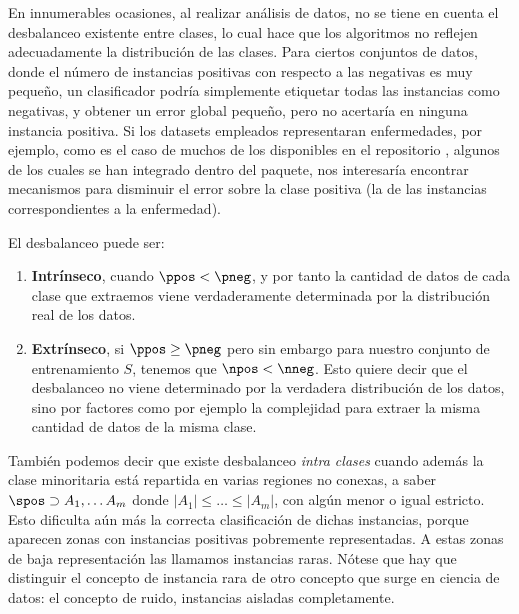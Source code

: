 En innumerables ocasiones, al realizar análisis de datos, no se tiene en cuenta el desbalanceo existente entre clases, lo
cual hace que los algoritmos no reflejen adecuadamente la distribución de las clases. Para ciertos conjuntos de datos,
donde el número de instancias positivas con respecto a las negativas es muy pequeño, un clasificador podría simplemente
etiquetar todas las instancias como negativas, y obtener un error global pequeño, pero no acertaría en ninguna instancia
positiva. Si los datasets empleados representaran enfermedades, por ejemplo, como es el caso de muchos de los
disponibles en el repositorio , algunos de los cuales se han integrado dentro del paquete, 
nos interesaría encontrar mecanismos para disminuir el error sobre la clase positiva (la de las instancias correspondientes
a la enfermedad).

El desbalanceo puede ser:

\begin{enumerate}[i]
  \item \textbf{Intrínseco}, cuando $\ppos < \pneg$, y por tanto la cantidad de datos de cada clase que extraemos viene 
  verdaderamente determinada por la distribución real de los datos.

  \item \textbf{Extrínseco}, si $\ppos \ge \pneg$ pero sin embargo para nuestro conjunto de entrenamiento $S$, 
  tenemos que $\npos < \nneg$. Esto quiere decir que el desbalanceo no viene determinado por la verdadera distribución de
  los datos, sino por factores como por ejemplo la complejidad para extraer la misma cantidad de datos de la misma clase.
\end{enumerate}

También podemos decir que existe desbalanceo \textit{intra clases} cuando además la clase minoritaria está repartida en varias 
regiones no conexas, a saber $\spos \supset A_1, \ldots A_m$ donde $|A_1| \le \ldots \le |A_m|$, con algún menor o igual estricto.
Esto dificulta aún más la correcta clasificación de dichas instancias, porque aparecen zonas con instancias positivas 
pobremente representadas. A estas zonas de baja representación las llamamos instancias raras. Nótese que hay que distinguir
el concepto de instancia rara de otro concepto que surge en ciencia de datos: el concepto de ruido, instancias aisladas completamente.
   
